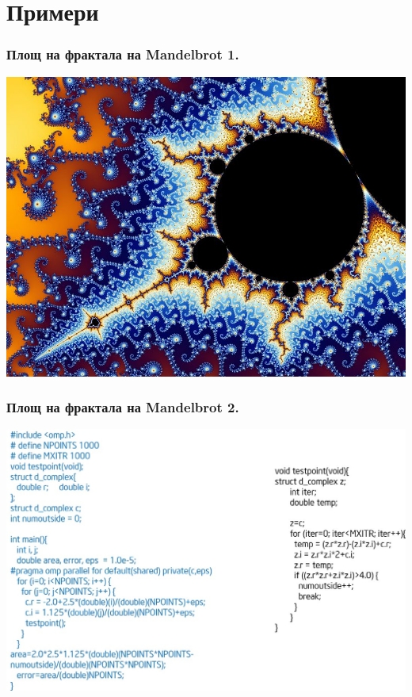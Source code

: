 \documentclass{beamer}
\begin{document}
\section{Примери}


\begin{frame}[plain]
  \frametitle{Площ на фрактала на Mandelbrot 1.}
  \includegraphics[width=1.05\textwidth]{mandelbr0}
\end{frame}

\begin{frame}[plain]
  \frametitle{Площ на фрактала на Mandelbrot 2.}
  \includegraphics[width=1.07\textwidth]{mandelbr1}
\end{frame}
\end{document}
